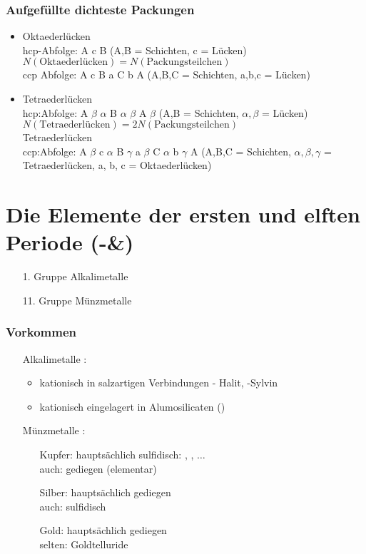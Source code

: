 \documentclass{article}
\begin{document}
\subsubsection{Aufgefüllte dichteste Packungen}
\begin{itemize}
    \item Oktaederlücken\\hcp-Abfolge: A c B (A,B = Schichten, c = Lücken)\\$N(\mathrm{Oktaederl\text{ü}cken})=N(\mathrm{Packungsteilchen})$\\
            ccp Abfolge: A c B a C b A (A,B,C = Schichten, a,b,c = Lücken)
    \item Tetraederlücken\\hcp:Abfolge: A $\beta$ $\alpha$ B $\alpha$ $\beta$ A $\beta$ (A,B = Schichten, $\alpha, \beta$ = Lücken)\\$N(\mathrm{Tetraederl\text{ü}cken})=2N(\mathrm{Packungsteilchen})$\\Tetraederlücken\\
            ccp:Abfolge: A $\beta$ c $\alpha$ B $\gamma$ a $\beta$ C $\alpha$ b $\gamma$ A (A,B,C = Schichten, $\alpha, \beta, \gamma$ = Tetraederlücken, a, b, c = Oktaederlücken)
\end{itemize}

\section{Die Elemente der ersten und elften Periode (-\&)}
\begin{itemize}
    \item[1. Gruppe] Alkalimetalle
    \item[11. Gruppe] Münzmetalle 
\end{itemize}
\subsubsection{Vorkommen}
\begin{itemize}
    \item[Alkalimetalle]:
    \begin{itemize}
        \item kationisch in salzartigen Verbindungen  - Halit,  -Sylvin
        \item kationisch eingelagert in Alumosilicaten ()
    \end{itemize}
    \item[Münzmetalle]:
    \begin{itemize}
        \item[Kupfer:] hauptsächlich sulfidisch: , , $\dots$\\auch: gediegen (elementar)
        \item[Silber:] hauptsächlich gediegen\\auch: sulfidisch
        \item[Gold:] hauptsächlich gediegen\\selten: Goldtelluride  
    \end{itemize}
\end{itemize}
\end{document}
